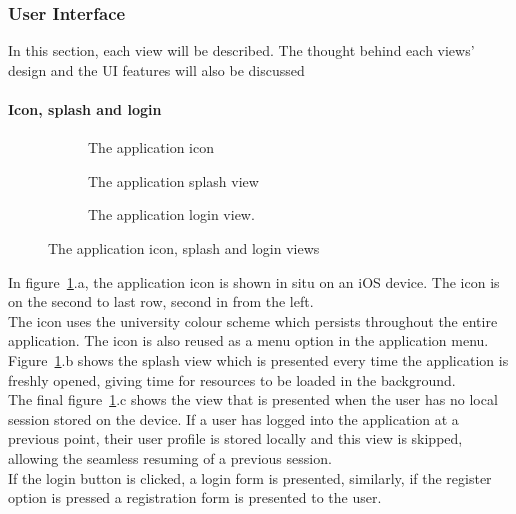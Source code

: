 \documentclass[preprint,12pt,3p]{elsarticle}
\begin{document}
\subsubsection{User Interface}
In this section, each view will be described. The thought behind each views' design and the UI features will also be discussed
\paragraph{Icon, splash and login}
\begin{figure}[H]
    \centering
    \begin{subfigure}[t]{0.32\columnwidth}
        \centering
        \caption{The application icon}
    \end{subfigure}
    \begin{subfigure}[t]{0.32\columnwidth}
        \centering
        \caption{The application splash view}
    \end{subfigure}
    \begin{subfigure}[t]{0.32\columnwidth}
        \centering
        \caption{The application login view.}
    \end{subfigure}
    \caption{The application icon, splash and login views}
    \label{fig:iconsplashlogin}
\end{figure}
In figure~\ref{fig:iconsplashlogin}.a, the application icon is shown in situ on an iOS device. The icon is on the second to last row, second in from the left.\\
The icon uses the university colour scheme which persists throughout the entire application. The icon is also reused as a menu option in the application menu.\\
Figure~\ref{fig:iconsplashlogin}.b shows the splash view which is presented every time the application is freshly opened, giving time for resources to be loaded in the background.\\
The final figure~\ref{fig:iconsplashlogin}.c shows the view that is presented when the user has no local session stored on the device. If a user has logged into the application at a previous point, their user profile is stored locally and this view is skipped, allowing the seamless resuming of a previous session.\\
If the login button is clicked, a login form is presented, similarly, if the register option is pressed a registration form is presented to the user.
\end{document}
